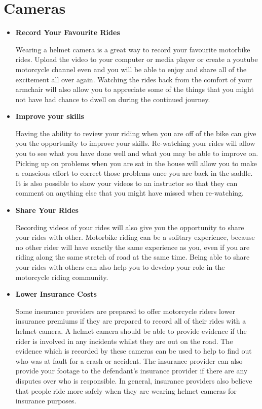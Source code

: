 \section{Cameras }
\begin{itemize}
	\item \textbf{Record Your Favourite Rides}
	
	Wearing a helmet camera is a great way to record your favourite motorbike rides. Upload the video to your computer or media player or create a youtube motorcycle channel even and you will be able to enjoy and share all of the excitement all over again. Watching the rides back from the comfort of your armchair will also allow you to appreciate some of the things that you might not have had chance to dwell on during the continued journey.
	
	\item \textbf{Improve your skills}
	
	Having the ability to review your riding when you are off of the bike can give you the opportunity to improve your skills. Re-watching your rides will allow you to see what you have done well and what you may be able to improve on. Picking up on problems when you are sat in the house will allow you to make a conscious effort to correct those problems once you are back in the saddle. It is also possible to show your videos to an instructor so that they can comment on anything else that you might have missed when re-watching.
	
	\item \textbf{Share Your Rides}
	
	Recording videos of your rides will also give you the opportunity to share your rides with other. Motorbike riding can be a solitary experience, because no other rider will have exactly the same experience as you, even if you are riding along the same stretch of road at the same time. Being able to share your rides with others can also help you to develop your role in the motorcycle riding community.
	
	\item \textbf{Lower Insurance Costs}
	
	Some insurance providers are prepared to offer motorcycle riders lower insurance premiums if they are prepared to record all of their rides with a helmet camera. A helmet camera should be able to provide evidence if the rider is involved in any incidents whilst they are out on the road. The evidence which is recorded by these cameras can be used to help to find out who was at fault for a crash or accident. The insurance provider can also provide your footage to the defendant’s insurance provider if there are any disputes over who is responsible. In general, insurance providers also believe that people ride more safely when they are wearing helmet cameras for insurance purposes.
	

\end{itemize}
